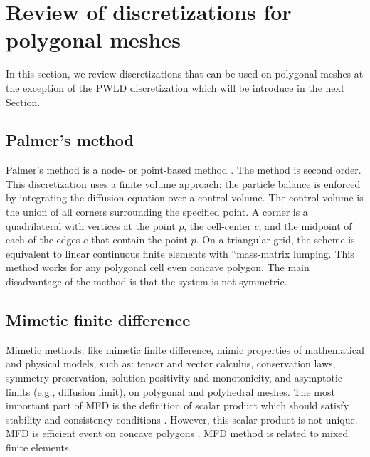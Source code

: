 \section{Review of discretizations for polygonal meshes} \label{sec_review}
In this section, we review discretizations that can be used on polygonal
meshes at the exception of the PWLD discretization which will be introduce in
the next Section.
\subsection{Palmer's method}
Palmer's method is a node- or point-based method \cite{Palmer2001}. The method
is second order. This discretization uses a finite volume approach: the
particle balance is enforced by integrating the diffusion equation over a
control volume. The control volume is the union of all corners surrounding the
specified point. A corner is a quadrilateral with vertices at the point $p$,
the cell-center $c$, and the midpoint of each of the edges $e$ that contain
the point $p$. On a triangular grid, the scheme is equivalent to linear
continuous finite elements with ``mass-matrix lumping. This method works for
any polygonal cell even concave polygon. The main disadvantage of the method
is that the system is not symmetric.
\subsection{Mimetic finite difference}
Mimetic methods, like mimetic finite difference, mimic properties of
mathematical and physical models, such as: tensor and vector calculus,
conservation laws, symmetry preservation, solution positivity and
monotonicity, and asymptotic limits (e.g., diffusion limit), on polygonal and
polyhedral meshes. The most important part of MFD is the definition of scalar
product which should satisfy stability and consistency conditions
\cite{Brezzi2005}. However, this scalar product is not unique. MFD is
efficient event on concave polygons \cite{Kuznetsov2004}. MFD method is
related to mixed finite elements.

